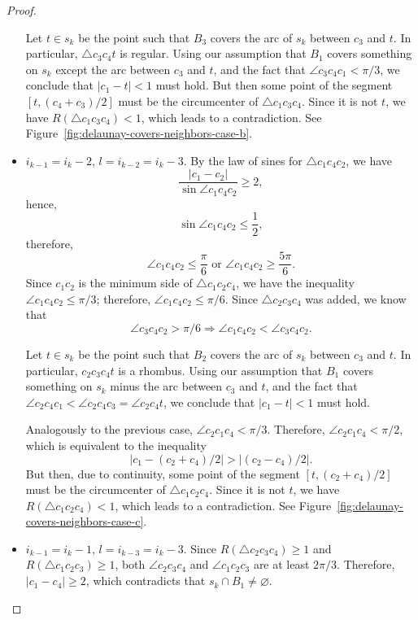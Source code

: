\begin{appendices}
\begin{proof}
\begin{itemize}
    Let $t\in s_k$ be the point such that $B_3$ covers the arc of $s_k$ between $c_3$ and $t$. In particular, $\triangle c_3c_4t$ is regular. Using our assumption that $B_1$ covers something on $s_k$ except the arc between $c_3$ and $t$, and the fact that $\angle c_3c_4c_1 < \pi/3$, we conclude that $|c_1 - t| < 1$ must hold. But then some point of the segment $[t, (c_4 + c_3)/2]$ must be the circumcenter of $\triangle c_1c_3c_4$. Since it is not $t$, we have $R(\triangle c_1c_3c_4) < 1$, which leads to a contradiction. See Figure~\ref{fig:delaunay-covers-neighbors-case-b}.
    \item $i_{k-1} = i_k - 2$, $l = i_{k-2} = i_k - 3$. By the law of sines for $\triangle c_1c_4c_2$, we have
    $$\frac{|c_1 - c_2|}{\sin\angle c_1c_4c_2}\geq 2,$$
    hence,
    $$\sin\angle c_1c_4c_2 \leq \frac{1}{2},$$
    therefore,
    $$\angle c_1c_4c_2 \leq \frac{\pi}{6}\text{ or }\angle c_1c_4c_2 \geq \frac{5\pi}{6}.$$
    Since $c_1c_2$ is the minimum side of $\triangle c_1c_2c_4$, we have the inequality $\angle c_1c_4c_2\leq\pi/3$; therefore, $\angle c_1c_4c_2\leq\pi/6$. Since $\triangle c_2c_3c_4$ was added, we know that
    $$\angle c_3c_4c_2 > \pi/6\Rightarrow \angle c_1c_4c_2 < \angle c_3c_4c_2.$$
    
    Let $t\in s_k$ be the point such that $B_2$ covers the arc of $s_k$ between $c_3$ and $t$. In particular, $c_2c_3c_4t$ is a rhombus. Using our assumption that $B_1$ covers something on $s_k$ minus the arc between $c_3$ and $t$, and the fact that $\angle c_2c_4c_1 < \angle c_2c_4c_3 = \angle c_2c_4t$, we conclude that $|c_1 - t| < 1$ must hold.
    
    Analogously to the previous case, $\angle{c_2c_1c_4} < \pi/3$. Therefore, $\angle c_2c_1c_4 < \pi/2$, which is equivalent to the inequality
    $$|c_1 - (c_2 + c_4)/2| > |(c_2 - c_4)/2|.$$
    But then, due to continuity, some point of the segment $[t, (c_2 + c_4)/2]$ must be the circumcenter of $\triangle c_1c_2c_4$. Since it is not $t$, we have $R(\triangle c_1c_2c_4) < 1$, which leads to a contradiction. See Figure~\ref{fig:delaunay-covers-neighbors-case-c}.
    \item $i_{k-1} = i_k - 1$, $l = i_{k-3} = i_k - 3$. Since $R(\triangle c_2c_3c_4)\geq 1$ and $R(\triangle c_1c_2c_3)\geq 1$, both $\angle c_2c_3c_4$ and $\angle c_1c_2c_3$ are at least $2\pi/3$. Therefore, $|c_1 - c_4|\geq 2$, which contradicts that $s_k\cap B_1\neq\varnothing$.
\end{itemize}


\end{proof}
\end{appendices}
